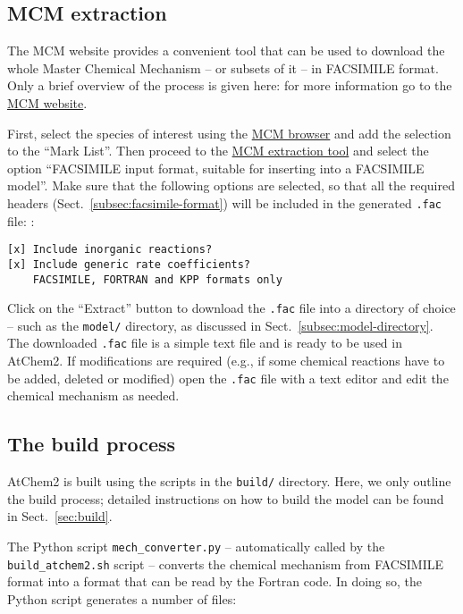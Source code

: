 \subsection{MCM extraction} \label{subsec:mcm-extraction}

The MCM website provides a convenient tool that can be used to
download the whole Master Chemical Mechanism -- or subsets of it -- in
FACSIMILE format. Only a brief overview of the process is given here:
for more information go to the \href{http://mcm.leeds.ac.uk/}{MCM website}.

First, select the species of interest using the
\href{http://mcm.leeds.ac.uk/MCM/roots.htt}{MCM browser} and add the
selection to the ``Mark List''. Then proceed to the
\href{http://mcm.leeds.ac.uk/MCM/extract.htt}{MCM extraction tool} and
select the option ``FACSIMILE input format, suitable for inserting
into a FACSIMILE model''. Make sure that the following options are
selected, so that all the required headers
(Sect.~\ref{subsec:facsimile-format}) will be included in the
generated \texttt{.fac} file: :

\begin{verbatim}
[x] Include inorganic reactions?
[x] Include generic rate coefficients?
    FACSIMILE, FORTRAN and KPP formats only
\end{verbatim}

Click on the ``Extract'' button to download the \texttt{.fac} file
into a directory of choice -- such as the \texttt{model/} directory,
as discussed in Sect.~\ref{subsec:model-directory}. The downloaded
\texttt{.fac} file is a simple text file and is ready to be used in
AtChem2. If modifications are required (e.g., if some chemical
reactions have to be added, deleted or modified) open the
\texttt{.fac} file with a text editor and edit the chemical mechanism
as needed.

\subsection{The build process} \label{subsec:build-process}

AtChem2 is built using the scripts in the \texttt{build/}
directory. Here, we only outline the build process; detailed
instructions on how to build the model can be found in
Sect.~\ref{sec:build}.

The Python script \texttt{mech\_converter.py} -- automatically called
by the \texttt{build\_atchem2.sh} script -- converts the chemical
mechanism from FACSIMILE format into a format that can be read by the
Fortran code. In doing so, the Python script generates a number of
files:

